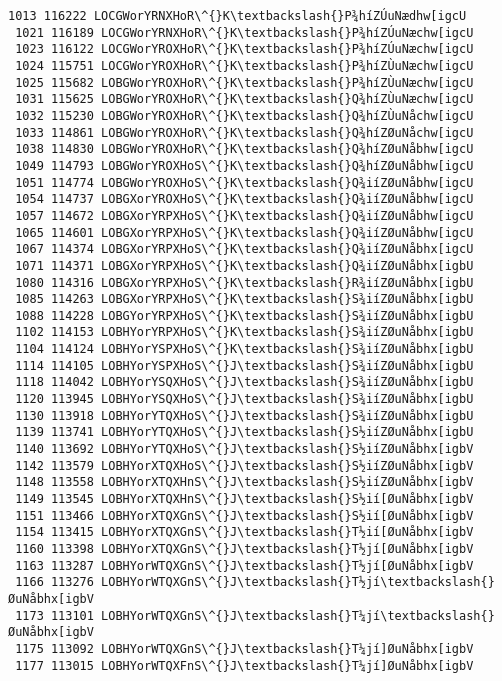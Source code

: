 \documentclass[11pt]{article}
\begin{document}
\begin{Verbatim}[commandchars=\\\{\}]
 1013 116222 LOCGWorYRNXHoR\^{}K\textbackslash{}P¾híZÚuNædhw[igcU
 1021 116189 LOCGWorYRNXHoR\^{}K\textbackslash{}P¾híZÚuNæchw[igcU
 1023 116122 LOCGWorYROXHoR\^{}K\textbackslash{}P¾híZÚuNæchw[igcU
 1024 115751 LOCGWorYROXHoR\^{}K\textbackslash{}P¾híZÙuNæchw[igcU
 1025 115682 LOBGWorYROXHoR\^{}K\textbackslash{}P¾híZÙuNæchw[igcU
 1031 115625 LOBGWorYROXHoR\^{}K\textbackslash{}Q¾híZÙuNæchw[igcU
 1032 115230 LOBGWorYROXHoR\^{}K\textbackslash{}Q¾híZÙuNåchw[igcU
 1033 114861 LOBGWorYROXHoR\^{}K\textbackslash{}Q¾híZØuNåchw[igcU
 1038 114830 LOBGWorYROXHoR\^{}K\textbackslash{}Q¾híZØuNåbhw[igcU
 1049 114793 LOBGWorYROXHoS\^{}K\textbackslash{}Q¾híZØuNåbhw[igcU
 1051 114774 LOBGWorYROXHoS\^{}K\textbackslash{}Q¾iíZØuNåbhw[igcU
 1054 114737 LOBGXorYROXHoS\^{}K\textbackslash{}Q¾iíZØuNåbhw[igcU
 1057 114672 LOBGXorYRPXHoS\^{}K\textbackslash{}Q¾iíZØuNåbhw[igcU
 1065 114601 LOBGXorYRPXHoS\^{}K\textbackslash{}Q¾iíZØuNåbhw[igcU
 1067 114374 LOBGXorYRPXHoS\^{}K\textbackslash{}Q¾iíZØuNåbhx[igcU
 1071 114371 LOBGXorYRPXHoS\^{}K\textbackslash{}Q¾iíZØuNåbhx[igbU
 1080 114316 LOBGXorYRPXHoS\^{}K\textbackslash{}R¾iíZØuNåbhx[igbU
 1085 114263 LOBGXorYRPXHoS\^{}K\textbackslash{}S¾iíZØuNåbhx[igbU
 1088 114228 LOBGYorYRPXHoS\^{}K\textbackslash{}S¾iíZØuNåbhx[igbU
 1102 114153 LOBHYorYRPXHoS\^{}K\textbackslash{}S¾iíZØuNåbhx[igbU
 1104 114124 LOBHYorYSPXHoS\^{}K\textbackslash{}S¾iíZØuNåbhx[igbU
 1114 114105 LOBHYorYSPXHoS\^{}J\textbackslash{}S¾iíZØuNåbhx[igbU
 1118 114042 LOBHYorYSQXHoS\^{}J\textbackslash{}S¾iíZØuNåbhx[igbU
 1120 113945 LOBHYorYSQXHoS\^{}J\textbackslash{}S¾iíZØuNåbhx[igbU
 1130 113918 LOBHYorYTQXHoS\^{}J\textbackslash{}S¾iíZØuNåbhx[igbU
 1139 113741 LOBHYorYTQXHoS\^{}J\textbackslash{}S½iíZØuNåbhx[igbU
 1140 113692 LOBHYorYTQXHoS\^{}J\textbackslash{}S½iíZØuNåbhx[igbV
 1142 113579 LOBHYorXTQXHoS\^{}J\textbackslash{}S½iíZØuNåbhx[igbV
 1148 113558 LOBHYorXTQXHnS\^{}J\textbackslash{}S½iíZØuNåbhx[igbV
 1149 113545 LOBHYorXTQXHnS\^{}J\textbackslash{}S½ií[ØuNåbhx[igbV
 1151 113466 LOBHYorXTQXGnS\^{}J\textbackslash{}S½ií[ØuNåbhx[igbV
 1154 113415 LOBHYorXTQXGnS\^{}J\textbackslash{}T½ií[ØuNåbhx[igbV
 1160 113398 LOBHYorXTQXGnS\^{}J\textbackslash{}T½jí[ØuNåbhx[igbV
 1163 113287 LOBHYorWTQXGnS\^{}J\textbackslash{}T½jí[ØuNåbhx[igbV
 1166 113276 LOBHYorWTQXGnS\^{}J\textbackslash{}T½jí\textbackslash{}ØuNåbhx[igbV
 1173 113101 LOBHYorWTQXGnS\^{}J\textbackslash{}T¼jí\textbackslash{}ØuNåbhx[igbV
 1175 113092 LOBHYorWTQXGnS\^{}J\textbackslash{}T¼jí]ØuNåbhx[igbV
 1177 113015 LOBHYorWTQXFnS\^{}J\textbackslash{}T¼jí]ØuNåbhx[igbV

\end{Verbatim}
\end{document}
